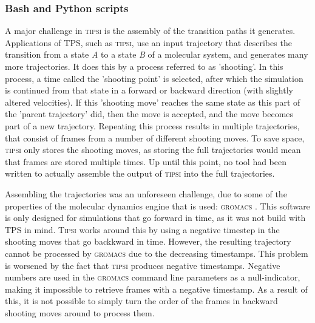 \documentclass[]{article}
\begin{document}
\subsubsection*{Bash and Python scripts}

A major challenge in \textsc{tipsi} is the assembly of the transition paths it generates. Applications of TPS, such as \textsc{tipsi}, use an input trajectory that describes the transition from a state \textit{A} to a state \textit{B} of a molecular system, and generates many more trajectories. It does this by a process referred to as 'shooting'. In this process, a time called the 'shooting point' is selected, after which the simulation is continued from that state in a forward or backward direction (with slightly altered velocities). If this 'shooting move' reaches the same state as this part of the 'parent trajectory' did, then the move is accepted, and the move becomes part of a new trajectory. Repeating this process results in multiple trajectories, that consist of frames from a number of different shooting moves. To save space, \textsc{tipsi} only stores the shooting moves, as storing the full trajectories would mean that frames are stored multiple times. Up until this point, no tool had been written to actually assemble the output of \textsc{tipsi} into the full trajectories.

Assembling the trajectories was an unforeseen challenge, due to some of the properties of the molecular dynamics engine that is used: \textsc{gromacs} \cite{gromacs}. This software is only designed for simulations that go forward in time, as it was not build with TPS in mind. \textsc{Tipsi} works around this by using a negative timestep in the shooting moves that go backkward in time. However, the resulting trajectory cannot be processed by \textsc{gromacs} due to the decreasing timestamps. This problem is worsened by the fact that \textsc{tipsi} produces negative timestamps. Negative numbers are used in the \textsc{gromacs} command line parameters as a null-indicator, making it impossible to retrieve frames with a negative timestamp. As a result of this, it is not possible to simply turn the order of the frames in backward shooting moves around to process them.  
\end{document}

